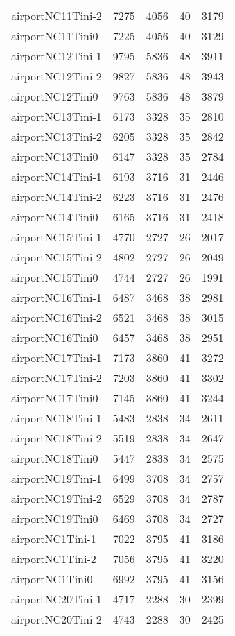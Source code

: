 \documentclass[../../../thesis.tex]{subfiles}
\begin{document}
\begin{longtable}{lrrrr}
airportNC11Tini-2 & 7275 & 4056 & 40 & 3179 \\
airportNC11Tini0 & 7225 & 4056 & 40 & 3129 \\
airportNC12Tini-1 & 9795 & 5836 & 48 & 3911 \\
airportNC12Tini-2 & 9827 & 5836 & 48 & 3943 \\
airportNC12Tini0 & 9763 & 5836 & 48 & 3879 \\
airportNC13Tini-1 & 6173 & 3328 & 35 & 2810 \\
airportNC13Tini-2 & 6205 & 3328 & 35 & 2842 \\
airportNC13Tini0 & 6147 & 3328 & 35 & 2784 \\
airportNC14Tini-1 & 6193 & 3716 & 31 & 2446 \\
airportNC14Tini-2 & 6223 & 3716 & 31 & 2476 \\
airportNC14Tini0 & 6165 & 3716 & 31 & 2418 \\
airportNC15Tini-1 & 4770 & 2727 & 26 & 2017 \\
airportNC15Tini-2 & 4802 & 2727 & 26 & 2049 \\
airportNC15Tini0 & 4744 & 2727 & 26 & 1991 \\
airportNC16Tini-1 & 6487 & 3468 & 38 & 2981 \\
airportNC16Tini-2 & 6521 & 3468 & 38 & 3015 \\
airportNC16Tini0 & 6457 & 3468 & 38 & 2951 \\
airportNC17Tini-1 & 7173 & 3860 & 41 & 3272 \\
airportNC17Tini-2 & 7203 & 3860 & 41 & 3302 \\
airportNC17Tini0 & 7145 & 3860 & 41 & 3244 \\
airportNC18Tini-1 & 5483 & 2838 & 34 & 2611 \\
airportNC18Tini-2 & 5519 & 2838 & 34 & 2647 \\
airportNC18Tini0 & 5447 & 2838 & 34 & 2575 \\
airportNC19Tini-1 & 6499 & 3708 & 34 & 2757 \\
airportNC19Tini-2 & 6529 & 3708 & 34 & 2787 \\
airportNC19Tini0 & 6469 & 3708 & 34 & 2727 \\
airportNC1Tini-1 & 7022 & 3795 & 41 & 3186 \\
airportNC1Tini-2 & 7056 & 3795 & 41 & 3220 \\
airportNC1Tini0 & 6992 & 3795 & 41 & 3156 \\
airportNC20Tini-1 & 4717 & 2288 & 30 & 2399 \\
airportNC20Tini-2 & 4743 & 2288 & 30 & 2425 \\

\end{longtable}
\end{document}
